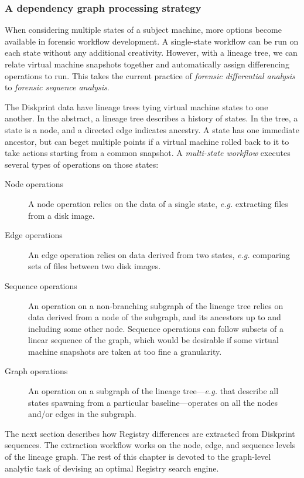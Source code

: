 \documentclass[11pt]{ucthesis}
\theoremstyle{plain}
\theoremstyle{definition}
\newcommand{\eg}{\emph{e.g.}\xspace}
\begin{document}
\subsubsection{A dependency graph processing strategy}

When considering multiple states of a subject machine, more options become available in forensic workflow development.  A single-state workflow can be run on each state without any additional creativity.  However, with a lineage tree, we can relate virtual machine snapshots together and automatically assign differencing operations to run.  This takes the current practice of \emph{forensic differential analysis} to \emph{forensic sequence analysis}.

The Diskprint data have lineage trees tying virtual machine states to one another.  In the abstract, a lineage tree describes a history of states.  In the tree, a state is a node, and a directed edge indicates ancestry.  A state has one immediate ancestor, but can beget multiple points if a virtual machine rolled back to it to take actions starting from a common snapshot.  A \emph{multi-state workflow} executes several types of operations on those states:

\begin{description}
\item[Node operations] A node operation relies on the data of a single state, \eg extracting files from a disk image.
\item[Edge operations] An edge operation relies on data derived from two states, \eg comparing sets of files between two disk images.
\item[Sequence operations] An operation on a non-branching subgraph of the lineage tree relies on data derived from a node of the subgraph, and its ancestors up to and including some other node.  Sequence operations can follow subsets of a linear sequence of the graph, which would be desirable if some virtual machine snapshots are taken at too fine a granularity.
\item[Graph operations] An operation on a subgraph of the lineage tree---\eg that describe all states spawning from a particular baseline---operates on all the nodes and/or edges in the subgraph.
\end{description}

The next section describes how Registry differences are extracted from Diskprint sequences.  The extraction workflow works on the node, edge, and sequence levels of the lineage graph.  The rest of this chapter is devoted to the graph-level analytic task of devising an optimal Registry search engine.
\end{document}
